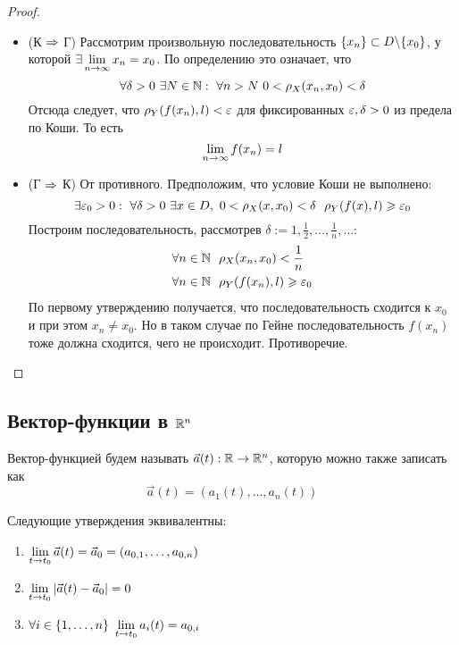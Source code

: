 \begin{proof}~
\begin{itemize}
	\item (К $\Rightarrow$ Г) Рассмотрим произвольную последовательность $\{x_n\} \subset D \backslash \{x_0\}$, у которой $\exists \lim\limits_{n \to \infty} x_n = x_0$. По определению это означает, что
	\[
		\forall \delta > 0\ \exists N \in \mathbb{N} :\  \forall n > N\ 0 < \rho_X(x_n, x_0) < \delta
	\]
	Отсюда следует, что $\rho_Y(f(x_n), l) < \varepsilon$ для фиксированных $\varepsilon, \delta > 0$ из предела по Коши. То есть
	\[
		\lim\limits_{n \to \infty} f(x_n) = l
	\]
	
	\item (Г $\Rightarrow$ К) От противного. Предположим, что условие Коши не выполнено:
	\[
		\exists \varepsilon_0 > 0 :\  \forall \delta > 0\ \exists x \in D,\ 0 < \rho_X(x, x_0) < \delta\ \ \rho_Y(f(x), l) \geqslant \varepsilon_0
	\]
	Построим последовательность, рассмотрев $\delta := 1, \frac{1}{2}, \ldots, \frac{1}{n}, \ldots$:
	\begin{align*}
		&{\forall n \in \mathbb{N}\ \ \rho_X(x_n, x_0) < \frac{1}{n}}
		\\
		&{\forall n \in \mathbb{N}\ \ \rho_Y(f(x_n), l) \geqslant \varepsilon_0}
	\end{align*}
	По первому утверждению получается, что последовательность сходится к $x_0$ и при этом $x_n \neq x_0$. Но в таком случае по Гейне последовательность $f(x_n)$ тоже должна сходится, чего не происходит. Противоречие.
\end{itemize}
\end{proof}

\subsection{Вектор-функции в $\mathbb{R}^n$}

\begin{definition}
	Вектор-функцией будем называть $\vec{a}(t): \mathbb{R} \to \mathbb{R}^n$, которую можно также записать как
	\[
		\vec{a}(t) = (a_1(t), \ldots, a_n(t))
	\]
\end{definition}

\begin{lemma} \label{vfeq}
	Следующие утверждения эквивалентны:
	\begin{enumerate}
		\item \(\lim\limits_{t \to t_0} \vec{a}(t) = \vec{a}_0 = (a_{0, 1}, \ldots, a_{0, n})\)
		
		\item \(\lim\limits_{t \to t_0} |\vec{a}(t) - \vec{a}_0| = 0\)
		
		\item \(\forall i \in \{1, \ldots, n\}\ \lim\limits_{t \to t_0} a_i(t) = a_{0, i}\)
	\end{enumerate}
\end{lemma}

